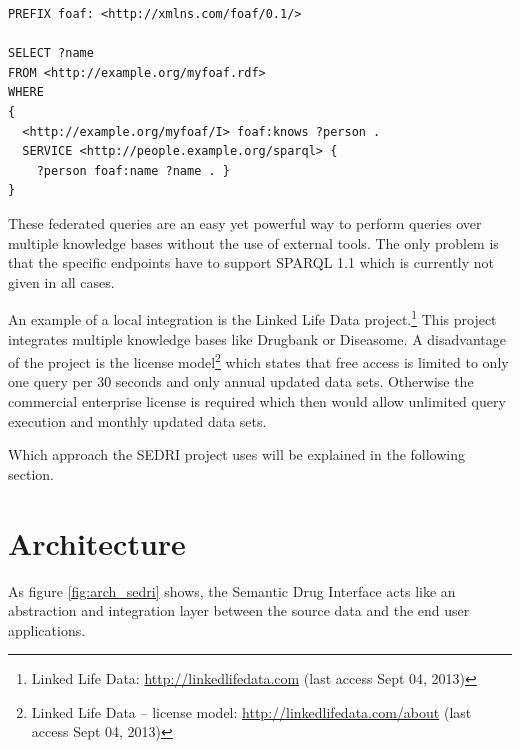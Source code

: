 \lstset{language=sparql}
\begin{lstlisting}[label=lst-fed,numbers=none,caption=Example of SPARQL 1.1 federated query]
PREFIX foaf: <http://xmlns.com/foaf/0.1/>

SELECT ?name
FROM <http://example.org/myfoaf.rdf>
WHERE
{
  <http://example.org/myfoaf/I> foaf:knows ?person .
  SERVICE <http://people.example.org/sparql> { 
    ?person foaf:name ?name . } 
}
\end{lstlisting}

These federated queries are an easy yet powerful way to perform queries over multiple knowledge bases without the use of external tools.
The only problem is that the specific endpoints have to support SPARQL 1.1 which is currently not given in all cases.

An example of a local integration is the Linked Life Data project.\footnote{Linked Life Data: \url{http://linkedlifedata.com} (last access Sept 04, 2013)}
This project integrates multiple knowledge bases like Drugbank or Diseasome.
A disadvantage of the project is the license model\footnote{Linked Life Data -- license model: \url{http://linkedlifedata.com/about} (last access Sept 04, 2013)} which states that free access is limited to only one query per 30 seconds and only annual updated data sets.
Otherwise the commercial enterprise license is required which then would allow unlimited query execution and monthly updated data sets.

Which approach the SEDRI project uses will be explained in the following section.

\section{Architecture}
\label{sec:architecture}

As figure \ref{fig:arch_sedri} shows, the Semantic Drug Interface acts like an abstraction and integration layer between the source data and the end user applications.

